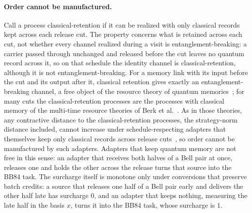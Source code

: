 \paragraph{Order cannot be manufactured.} Call a process classical-retention if it can be realized with only classical records kept across each release cut. The property concerns what is retained across each cut, not whether every channel realized during a visit is entanglement-breaking: a carrier passed through unchanged and released before the cut leaves no quantum record across it, so on that schedule the identity channel is classical-retention, although it is not entanglement-breaking. For a memory link with its input before the cut and its output after it, classical retention gives exactly an entanglement-breaking channel, a free object of the resource theory of quantum memories~\cite{RBL18}; for many cuts the classical-retention processes are the processes with classical memory of the multi-time resource theories of Berk et al.~\cite{Berk21}. As in those theories, any contractive distance to the classical-retention processes, the strategy-norm distance included, cannot increase under schedule-respecting adapters that themselves keep only classical records across release cuts~\cite[Thm.~1]{Berk21}, so order cannot be manufactured by such adapters. Adapters that keep quantum memory are not free in this sense: an adapter that receives both halves of a Bell pair at once, releases one and holds the other across the release turns that source into the BB84 task. The surcharge itself is monotone only under conversions that preserve batch credits: a source that releases one half of a Bell pair early and delivers the other half late has surcharge $0$, and an adapter that keeps nothing, measuring the late half in the basis $x$, turns it into the BB84 task, whose surcharge is $1$.

